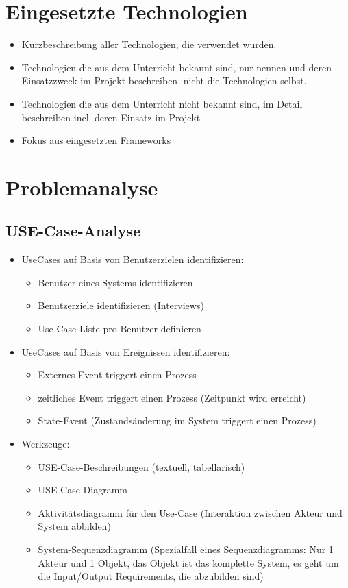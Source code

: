 \chapter{Eingesetzte Technologien} \label{sec:tech}
\begin{itemize}
	\item Kurzbeschreibung aller Technologien, die verwendet wurden.
	\item Technologien die aus dem Unterricht bekannt sind, nur nennen und deren  Einsatzzweck im Projekt beschreiben, nicht die Technologien selbst.
	\item Technologien die aus dem Unterricht nicht bekannt sind, im Detail beschreiben incl. deren Einsatz im Projekt
	\item Fokus aus eingesetzten Frameworks
\end{itemize}



\chapter{Problemanalyse}
\section{USE-Case-Analyse}
\begin{itemize}
	\item UseCases auf Basis von Benutzerzielen identifizieren: 
	\begin{itemize}
		\item Benutzer eines Systems identifizieren
		\item Benutzerziele identifizieren (Interviews)
		\item Use-Case-Liste pro Benutzer definieren
	\end{itemize}
	\item UseCases auf Basis von Ereignissen identifizieren: 
	\begin{itemize}
		\item Externes Event triggert einen Prozess
		\item zeitliches Event triggert einen Prozess (Zeitpunkt wird erreicht) 
		\item State-Event (Zustandsänderung im System triggert einen Prozess)
	\end{itemize}
	\item Werkzeuge:
	\begin{itemize}
		\item USE-Case-Beschreibungen (textuell, tabellarisch)
		\item USE-Case-Diagramm
		\item Aktivitätsdiagramm für den Use-Case (Interaktion zwischen Akteur und System abbilden)
		\item System-Sequenzdiagramm (Spezialfall eines Sequenzdiagramms: Nur 1 Akteur und 1 Objekt, das Objekt ist das komplette System, es geht um die Input/Output Requirements, die abzubilden sind)
	\end{itemize}
\end{itemize}

